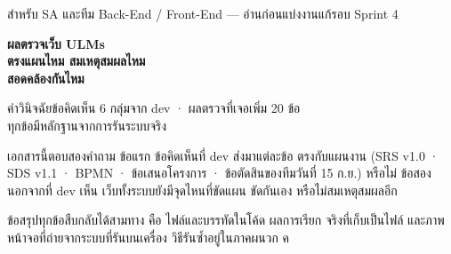 \newcommand{\fmeta}[3]{\par\noindent{\sansall\footnotesize\color{muted}%
  \textbf{\color{ink}#1}\quad ที่มา: #2\quad เจ้าของงาน: #3}\par\smallskip}
\newcommand{\fstep}[1]{\par\medskip\noindent{\sansall\small\bfseries\color{ctr!80!black}#1}\par\nobreak\smallskip}



\begin{titlepage}
\thispagestyle{empty}

\vspace*{1.4cm}
{\sansall\color{muted}\small สำหรับ SA และทีม Back-End / Front-End --- อ่านก่อนแบ่งงานแก้รอบ Sprint 4}

\vspace{0.9cm}
{\sansall\bfseries\fontsize{27}{33}\selectfont\color{ctr!90!black}
ผลตรวจเว็บ ULMs\\ตรงแผนไหม สมเหตุสมผลไหม\\สอดคล้องกันไหม\par}

\vspace{0.5cm}
{\sansall\fontsize{13.5}{19}\selectfont\color{ink}
คำวินิจฉัยข้อคิดเห็น 6 กลุ่มจาก dev · ผลตรวจที่เจอเพิ่ม 20 ข้อ\\
ทุกข้อมีหลักฐานจากการรันระบบจริง\par}

\vspace{2.4cm}
\begin{minipage}{0.7\textwidth}
เอกสารนี้ตอบสองคำถาม ข้อแรก ข้อคิดเห็นที่ dev ส่งมาแต่ละข้อ ตรงกับแผนงาน
(SRS v1.0 · SDS v1.1 · BPMN · ข้อเสนอโครงการ · ข้อตัดสินของทีมวันที่ 15 ก.ย.) หรือไม่
ข้อสอง นอกจากที่ dev เห็น เว็บทั้งระบบยังมีจุดไหนที่ขัดแผน ขัดกันเอง หรือไม่สมเหตุสมผลอีก

\vspace{0.6em}
ข้อสรุปทุกข้อสืบกลับได้สามทาง คือ ไฟล์และบรรทัดในโค้ด ผลการเรียก  จริงที่เก็บเป็นไฟล์
และภาพหน้าจอที่ถ่ายจากระบบที่รันบนเครื่อง วิธีรันซ้ำอยู่ในภาคผนวก ค
\end{minipage}


\end{titlepage}
